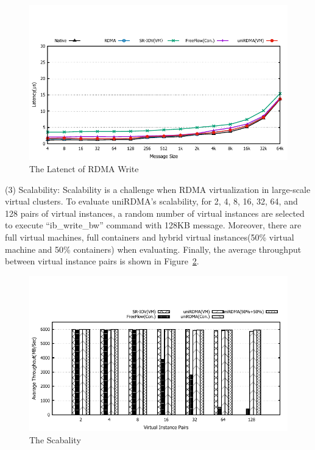 \begin{figure}[!ht]
	\centering
	\includegraphics[width=1.0\linewidth]{images/write-lat.pdf}
	\caption{The Latenct of RDMA Write}
	\label{fig:write-lat}
\end{figure}
(3) Scalability: 
Scalability is a challenge when RDMA virtualization in large-scale virtual clusters. To evaluate uniRDMA's scalability, for 2, 4, 8, 16, 32, 64, and 128 pairs of virtual instances, a random number of virtual instances are selected to execute ``ib\_write\_bw'' command with 128KB message. Moreover, there are full virtual machines, full containers and hybrid virtual instances(50\% virtual machine and 50\% containers) when evaluating. Finally, the average throughput between virtual instance pairs is shown in Figure~\ref{fig:scabality}.

\begin{figure}[!ht]
	\centering
	\includegraphics[width=1.0\linewidth]{images/scabality.pdf}
	\caption{The Scabality}
	\label{fig:scabality}
\end{figure}

